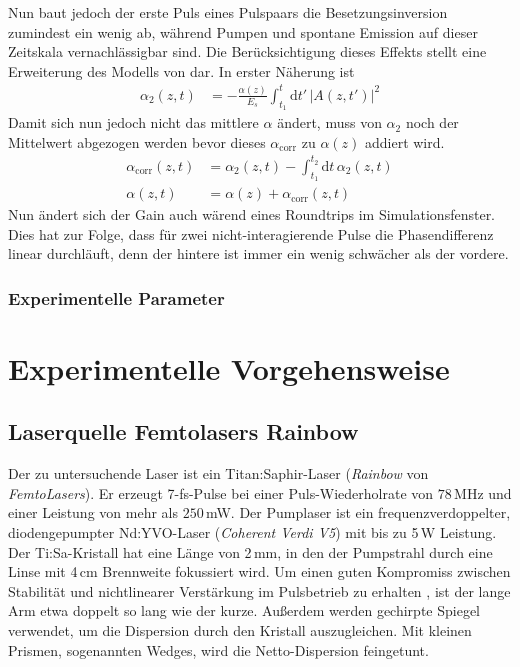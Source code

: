 \documentclass[bachelor,       %
               twoside,        %
               BCOR10mm,       %
               liststotoc,nomtotoc,bibtotoc, %
               english,ngerman, %
               final,          %
               ]{GAUBM}
\newcommand{\dif}{\ensuremath{\mathrm{d}}}
\begin{document}
Nun baut jedoch der erste Puls eines Pulspaars die Besetzungsinversion zumindest ein wenig ab, während Pumpen und spontane Emission auf dieser Zeitskala vernachlässigbar sind.
Die Berücksichtigung dieses Effekts stellt eine Erweiterung des Modells von \cite{kalashnikov_multipulse_2003} dar.
In erster Näherung ist
\begin{align}
	\alpha_2(z,t)&=-\frac{\alpha(z)}{E_s}\int_{t_1}^{t} \dif t'\, |A(z,t')|^2
\end{align}
Damit sich nun jedoch nicht das mittlere $\alpha$ ändert, muss von $\alpha_2$ noch der Mittelwert abgezogen werden bevor dieses $\alpha_\text{corr}$ zu $\alpha(z)$ addiert wird.
\begin{align}
	\alpha_\text{corr}(z,t)&=\alpha_2(z,t)-\int_{t_1}^{t_2} \dif t\, \alpha_2(z,t)\\
	\alpha(z,t)&=\alpha(z)+\alpha_\text{corr}(z,t)
\end{align}
Nun ändert sich der Gain auch wärend eines Roundtrips im Simulationsfenster.
Dies hat zur Folge, dass für zwei nicht-interagierende Pulse die Phasendifferenz linear durchläuft, denn der hintere ist immer ein wenig schwächer als der vordere.

\subsection{Experimentelle Parameter}

\chapter{Experimentelle Vorgehensweise}
\section{Laserquelle Femtolasers Rainbow}
Der zu untersuchende Laser ist ein Titan:Saphir-Laser (\textit{Rainbow} von \textit{FemtoLasers}).
Er erzeugt 7-fs-Pulse bei einer Puls-Wiederholrate von $78\,$MHz und einer Leistung von mehr als $250\,$mW.
Der Pumplaser ist ein frequenzverdoppelter, diodengepumpter Nd:YVO-Laser (\textit{Coherent Verdi V5}) mit bis zu 5\,W Leistung.
Der Ti:Sa-Kristall hat eine Länge von 2\,mm, in den der Pumpstrahl durch eine Linse mit 4\,cm Brennweite fokussiert wird.
Um einen guten Kompromiss zwischen Stabilität und nichtlinearer Verstärkung im Pulsbetrieb zu erhalten \cite{stingl_sub-10-fs_1995}, ist der lange Arm etwa doppelt so lang wie der kurze.
Außerdem werden gechirpte Spiegel verwendet, um die Dispersion durch den Kristall auszugleichen.
Mit kleinen Prismen, sogenannten Wedges, wird die Netto-Dispersion feingetunt.
\end{document}

